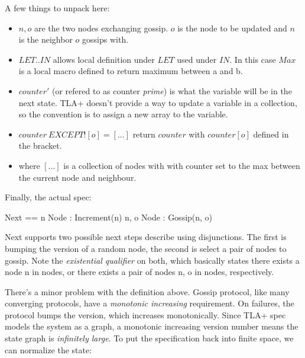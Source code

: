 \documentclass{report}
\begin{document}
A few things to unpack here:
\begin{itemize}
    \item $n, o$ are the two nodes exchanging gossip. $o$ is the node to be updated
    and $n$ is the neighbor $o$ gossips with.
    \item $LET .. IN$ allows local definition under $LET$ used under
    $IN$. In this case $Max$ is a local macro defined to return maximum between a and b.
    \item $counter'$ (or refered to as counter \textit{prime}) is what the
    variable will be in the next state. TLA+ doesn't provide a way to update a
    variable in a collection, so the convention is to assign a new array to the variable. 
    \item $counter\ EXCEPT ![o] = [...]$ return $counter$ with $counter[o]$
    defined in the bracket. 
    \item where $[...]$ is a collection of nodes with with counter set to the
    max between the current node and neighbour.
\end{itemize}

Finally, the actual spec: \newline
\begin{tla}
    Next == \/ \E n \in Node : Increment(n)
            \/ \E n, o \in Node : Gossip(n, o)
\end{tla}
\begin{tlatex}
%
\end{tlatex}
\newline

Next supports two possible next steps describe using disjunctions. The first is
bumping the version of a random node, the second is select a pair of nodes to
gossip. Note the \textit{existential qualifier} on both, which basically states
there exists a node n in nodes, or there exists a pair of nodes n, o in nodes,
respectively.\newline

There's a minor problem with the definition above. Gossip protocol, like many
converging protocols, have a \textit{monotonic increasing} requirement. On
failures, the protocol bumps the version, which increases monotonically. Since
TLA+ spec models the system as a graph, a monotonic increasing version number
means the state graph is \textit{infinitely large}. To put the specification back into
finite space, we can normalize the state:\newline
\end{document}
